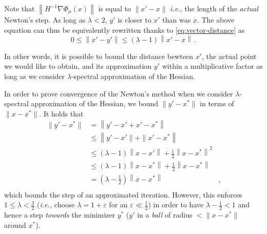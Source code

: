 Note that $\left\| H^{-1} \nabla\Phi_\mu(x) \right\|$ is equal to $\|x' - x \|$
\emph{i.e.,} the length of the \emph{actual} Newton's step. As long as $\lambda
< 2$, $y'$ is closer to $x'$ than was $x$. The above equation can thus be
equivalently rewritten thanks to \autoref{eq:vector-distance} as
\begin{equation} \label{eq:x1-y1-bound}
    0 \leq \left\| x' - y' \right\|
 \leq (\lambda - 1) \left\|x' - x \right\| \, .
\end{equation}

In other words, it is possible to bound the distance bewteen $x'$, the actual
point we would like to obtain, and its approximation $y'$ within a
multiplicative factor as long as we consider $\lambda$-spectral approximation of
the Hessian.

In order to prove convergence of the Newton's method when we consider
$\lambda$-spectral approximation of the Hessian, we bound $\|y' - x^* \|$ in
terms of $\|x - x^*\|$. It holds that
\begin{equation}\label{eq:bound-opt-approx-hessian}
    \begin{aligned}
       \| y'-x^*\|
            & =\left\| y' - x' + x' - x^* \right\| \\
            & \leq \left\| y' - x' \| + \| x' - x^* \right\| \\
            & \leq (\lambda - 1) \left\| x - x' \right\| + \frac 1 2 \left\| x - x^*\right\|^2 \\
            & \leq (\lambda - 1) \left\| x - x^* \right\| + \frac{1}{2} \left\| x - x^* \right\| \\
            & = (\lambda - \frac{1}{2}) \left\| x - x^*\right\| & ,\\
    \end{aligned}
\end{equation}
which bounds the step of an approximated iteration. However, this enforces $ 1
\leq \lambda < \frac 3 2$ (\emph{i.e.,} choose $\lambda = 1 + \varepsilon$ for
an $\varepsilon \ll \frac 1 2$) in order to have $\lambda - \frac{1}{2} < 1$ and
hence a step \emph{towards} the minimizer $y^*$ ($y'$ in a \emph{ball} of radius
$ <\| x - x^*\|$ around $x^*$).